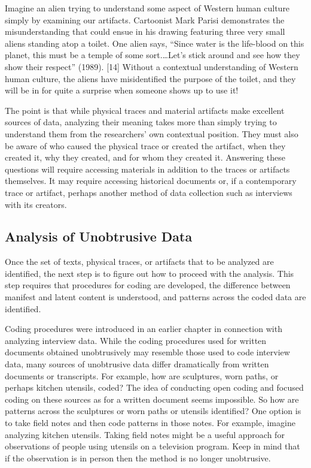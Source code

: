 Imagine an alien trying to understand some aspect of Western human culture simply by examining our artifacts. Cartoonist Mark Parisi demonstrates the misunderstanding that could ensue in his drawing featuring three very small aliens standing atop a toilet. One alien says, ``Since water is the life-blood on this planet, this must be a temple of some sort.…Let's stick around and see how they show their respect'' (1989). [14] Without a contextual understanding of Western human culture, the aliens have misidentified the purpose of the toilet, and they will be in for quite a surprise when someone shows up to use it!

The point is that while physical traces and material artifacts make excellent sources of data, analyzing their meaning takes more than simply trying to understand them from the researchers' own contextual position. They must also be aware of who caused the physical trace or created the artifact, when they created it, why they created, and for whom they created it. Answering these questions will require accessing materials in addition to the traces or artifacts themselves. It may require accessing historical documents or, if a contemporary trace or artifact, perhaps another method of data collection such as interviews with its creators.

\subsection{Analysis of Unobtrusive Data}

Once the set of texts, physical traces, or artifacts that to be analyzed are identified, the next step is to figure out how to proceed with the analysis. This step requires that procedures for coding are developed, the difference between manifest and latent content is understood, and patterns across the coded data are identified.

Coding procedures were introduced in an earlier chapter in connection with analyzing interview data. While the coding procedures used for written documents obtained unobtrusively may resemble those used to code interview data, many sources of unobtrusive data differ dramatically from written documents or transcripts. For example, how are sculptures, worn paths, or perhaps kitchen utensils, coded? The idea of conducting open coding and focused coding on these sources as for a written document seems impossible. So how are patterns across the sculptures or worn paths or utensils identified? One option is to take field notes and then code patterns in those notes. For example, imagine analyzing kitchen utensils. Taking field notes might be a useful approach for observations of people using utensils on a television program. Keep in mind that if the observation is in person then the method is no longer unobtrusive.


